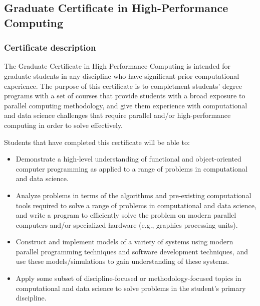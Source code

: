 \subsection{Graduate Certificate in High-Performance Computing}
\label{sec:cert_hpc}

\subsubsection{Certificate description}

The Graduate Certificate in High Performance Computing is intended for
graduate students in any discipline who have significant prior
computational experience.  The purpose of this certificate is to
completment students' degree programs with a set of courses that
provide students with a broad exposure to parallel computing
methodology, and give them experience with computational and data
science challenges that require parallel and/or high-performance
computing in order to solve effectively.

\vspace{2mm}

\noindent
Students that have completed this certificate will be able to:

\begin{itemize}
\item  Demonstrate a high-level understanding of functional and
  object-oriented computer programming as applied to a range of
  problems in computational and data science.

\item  Analyze problems in terms of the algorithms and pre-existing
  computational tools required to solve a range of problems in
  computational and data science, and write a program to efficiently
  solve the problem on modern parallel computers and/or specialized
  hardware (e.g., graphics processing units).

\item  Construct and implement models of a variety of systems using
  modern parallel programming techniques and software development
  techniques, and use these models/simulations to gain understanding
  of these systems.

\item  Apply some subset of discipline-focused or methodology-focused
topics in computational and data science to solve problems in the
student’s primary discipline.

\end{itemize}

